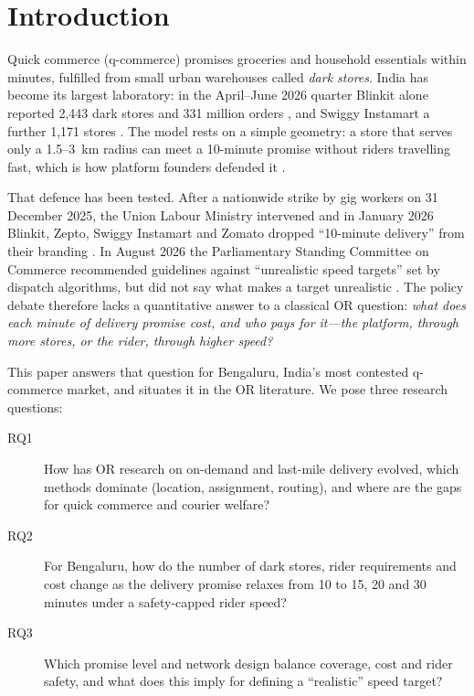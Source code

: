\section{Introduction}\label{sec:intro}

Quick commerce (q-commerce) promises groceries and household essentials within minutes, fulfilled from small urban warehouses called \emph{dark stores}. India has become its largest laboratory: in the April--June 2026 quarter Blinkit alone reported 2,443 dark stores and 331 million orders \citep{eternal2026q1}, and Swiggy Instamart a further 1,171 stores \citep{swiggy2026q1}. The model rests on a simple geometry: a store that serves only a 1.5--3~km radius can meet a 10-minute promise without riders travelling fast, which is how platform founders defended it \citep{palicha2022,dhindsa2021}.

That defence has been tested. After a nationwide strike by gig workers on 31 December 2025, the Union Labour Ministry intervened and in January 2026 Blinkit, Zepto, Swiggy Instamart and Zomato dropped ``10-minute delivery'' from their branding \citep{outlook2026drop}. In August 2026 the Parliamentary Standing Committee on Commerce recommended guidelines against ``unrealistic speed targets'' set by dispatch algorithms, but did not say what makes a target unrealistic \citep{outlook2026panel}. The policy debate therefore lacks a quantitative answer to a classical OR question: \emph{what does each minute of delivery promise cost, and who pays for it---the platform, through more stores, or the rider, through higher speed?}

This paper answers that question for Bengaluru, India's most contested q-commerce market, and situates it in the OR literature. We pose three research questions:

\begin{description}
  \item[RQ1] How has OR research on on-demand and last-mile delivery evolved, which methods dominate (location, assignment, routing), and where are the gaps for quick commerce and courier welfare?
  \item[RQ2] For Bengaluru, how do the number of dark stores, rider requirements and cost change as the delivery promise relaxes from 10 to 15, 20 and 30 minutes under a safety-capped rider speed?
  \item[RQ3] Which promise level and network design balance coverage, cost and rider safety, and what does this imply for defining a ``realistic'' speed target?
\end{description}

